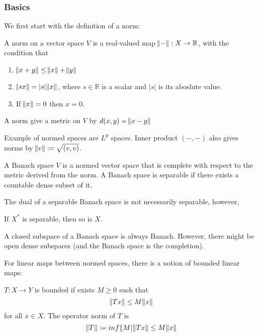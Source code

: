 \documentclass[main.tex]{subfiles}
\begin{document}
\subsubsection{Basics}

We first start with the definition of a norm:

\begin{definition}
A norm on a vector space $V$ is a real-valued map $\norm{-} : X \rightarrow \mathbb{R}$, with the condition that 
\begin{enumerate}
    \item $\norm{x + y} \leq \norm{x} + \norm{y}$
    \item $\norm{s x} = |s| \norm{x}$, where $s \in \mathbb{R}$ is a scalar and $|s|$ is its aboslute value.
    \item If $\norm{x} = 0$ then $x = 0$.
\end{enumerate}

A norm give a metric on $V$ by $d(x, y) = \norm{x -y}$
\end{definition}

\begin{example}
Example of normed spaces are $L^p$ spaces. Inner product $(-,-)$ also gives norms by $\norm{v} \coloneqq \sqrt{(v,v)}$. 
\end{example}


\begin{definition}
A Banach space $V$ is a normed vector space that is complete with respect to the metric derived from the norm. A Banach space is separable if there exists a countable dense subset of it.
\end{definition}

The dual of a separable Banach space is not necessarily separable, however, 

\begin{proposition}
If $X^*$ is separable, then so is $X$.
\end{proposition}


A closed subspace of a Banach space is always Banach. However, there might be open dense subspaces (and the Banach space is the completion).

For linear maps between normed spaces, there is a notion of bounded linear maps:

\begin{definition}
$T: X \rightarrow Y$ is bounded if exists $M \geq 0$ such that 
$$
\norm{Tx} \leq M \norm{x}
$$
for all $x \in X$. The operator norm of $T$ is 
$$
\norm{T} \coloneqq inf \{ M | \norm{Tx} \leq M \norm{x}
$$
\end{definition}
\end{document}
